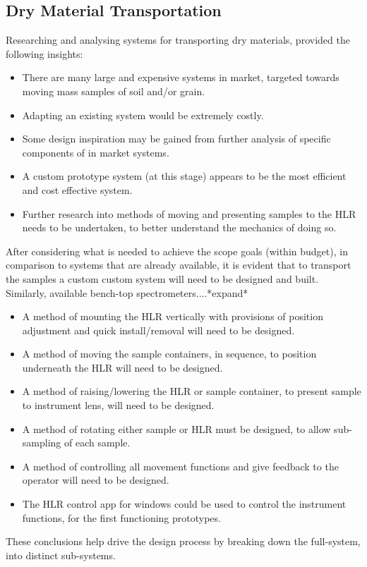 \documentclass{UoNMCHA}
\numberwithin{equation}{section}
\begin{document}
\subsection{Dry Material Transportation}
Researching and analysing systems for transporting dry materials, provided the following insights:
\begin{itemize}
	\item There are many large and expensive systems in market, targeted towards moving mass samples of soil and/or grain.
	\item Adapting an existing system would be extremely costly.
	\item Some design inspiration may be gained from further analysis of specific components of in market systems.
	\item A custom prototype system (at this stage) appears to be the most efficient and cost effective system.
	\item Further research into methods of moving and presenting samples to the HLR needs to be undertaken, to better understand the mechanics of doing so.
\end{itemize}
After considering what is needed to achieve the scope goals (within budget), in comparison to systems that are already available, it is evident that to transport the samples a custom custom system will need to be designed and built. Similarly, available bench-top spectrometers....*expand*\\

\begin{itemize}
	\item A method of mounting the HLR vertically with provisions of position adjustment and quick install/removal will need to be designed.
	\item A method of moving the sample containers, in sequence, to position underneath the HLR will need to be designed.
	\item A method of raising/lowering the HLR or sample container, to present sample to instrument lens, will need to be designed.
	\item A method of rotating either sample or HLR must be designed, to allow sub-sampling of each sample.
	\item A method of controlling all movement functions and give feedback to the operator will need to be designed.
	\item The HLR control app for windows could be used to control the instrument functions, for the first functioning prototypes.
\end{itemize}
These conclusions help drive the design process by breaking down the full-system, into distinct sub-systems.\\ 
\end{document}
